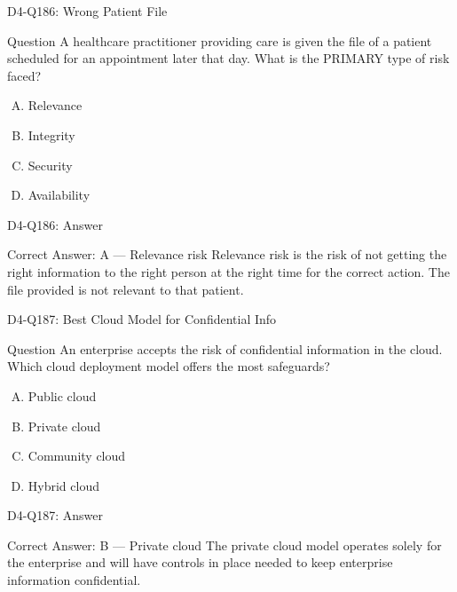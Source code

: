 \documentclass{beamer}
\begin{document}
	\begin{frame}{D4-Q186: Wrong Patient File}
		\begin{block}{Question}
			A healthcare practitioner providing care is given the file of a patient scheduled for an appointment later that day. What is the PRIMARY type of risk faced?
		\end{block}
		\begin{enumerate}[(A)]
			\item Relevance
			\item Integrity
			\item Security
			\item Availability
		\end{enumerate}
	\end{frame}
	\begin{frame}{D4-Q186: Answer}
		\begin{block}{Correct Answer: A --- Relevance risk}
			Relevance risk is the risk of not getting the right information to the right person at the right time for the correct action. The file provided is not relevant to that patient.
		\end{block}
	\end{frame}
	
	\begin{frame}{D4-Q187: Best Cloud Model for Confidential Info}
		\begin{block}{Question}
			An enterprise accepts the risk of confidential information in the cloud. Which cloud deployment model offers the most safeguards?
		\end{block}
		\begin{enumerate}[(A)]
			\item Public cloud
			\item Private cloud
			\item Community cloud
			\item Hybrid cloud
		\end{enumerate}
	\end{frame}
	\begin{frame}{D4-Q187: Answer}
		\begin{block}{Correct Answer: B --- Private cloud}
			The private cloud model operates solely for the enterprise and will have controls in place needed to keep enterprise information confidential.
		\end{block}
	\end{frame}
	
\end{document}
